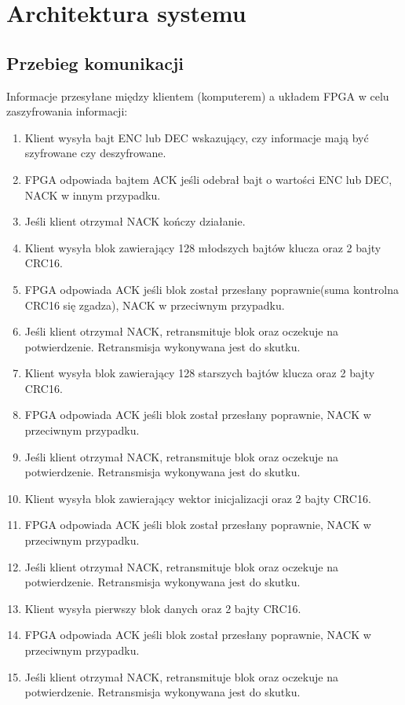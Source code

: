 \section{Architektura systemu}
\label{sec:architektura-systemu}

\subsection{Przebieg komunikacji}
\label{sec:przebieg-komunikacji}
Informacje przesyłane między klientem (komputerem) a układem FPGA w celu zaszyfrowania informacji:
\begin{enumerate}[noitemsep]
\item Klient wysyła bajt ENC lub DEC wskazujący, czy informacje mają być szyfrowane czy deszyfrowane.
\item FPGA odpowiada bajtem ACK jeśli odebrał bajt o wartości ENC lub DEC, NACK w innym przypadku.
\item Jeśli klient otrzymał NACK kończy działanie.
\item Klient wysyła blok zawierający 128 młodszych bajtów klucza oraz 2 bajty CRC16.
\item FPGA odpowiada ACK jeśli blok został przesłany poprawnie(suma kontrolna CRC16 się zgadza), NACK w przeciwnym przypadku.
\item Jeśli klient otrzymał NACK, retransmituje blok oraz oczekuje na potwierdzenie. Retransmisja wykonywana jest do skutku.
\item Klient wysyła blok zawierający 128 starszych bajtów klucza oraz 2 bajty CRC16.
\item FPGA odpowiada ACK jeśli blok został przesłany poprawnie, NACK w przeciwnym przypadku.
\item Jeśli klient otrzymał NACK, retransmituje blok oraz oczekuje na potwierdzenie. Retransmisja wykonywana jest do skutku.
\item Klient wysyła blok zawierający wektor inicjalizacji oraz 2 bajty CRC16.
\item FPGA odpowiada ACK jeśli blok został przesłany poprawnie, NACK w przeciwnym przypadku.
\item Jeśli klient otrzymał NACK, retransmituje blok oraz oczekuje na potwierdzenie. Retransmisja wykonywana jest do skutku.
\item Klient wysyła pierwszy blok danych oraz 2 bajty CRC16.
\item FPGA odpowiada ACK jeśli blok został przesłany poprawnie, NACK w przeciwnym przypadku.
\item Jeśli klient otrzymał NACK, retransmituje blok oraz oczekuje na potwierdzenie. Retransmisja wykonywana jest do skutku.

\end{enumerate}
